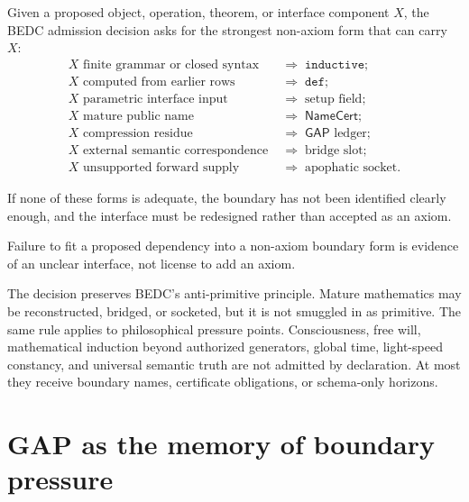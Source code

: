 \begin{definition}
\label{def:external-supply-admission-decision}
Given a proposed object, operation, theorem, or interface component $X$, the BEDC admission decision asks for the strongest non-axiom form that can carry $X$:
$$
\begin{aligned}
X \text{ finite grammar or closed syntax} &\;\Longrightarrow\; \texttt{inductive}; \\
X \text{ computed from earlier rows} &\;\Longrightarrow\; \texttt{def}; \\
X \text{ parametric interface input} &\;\Longrightarrow\; \text{setup field}; \\
X \text{ mature public name} &\;\Longrightarrow\; \mathsf{NameCert}; \\
X \text{ compression residue} &\;\Longrightarrow\; \mathsf{GAP}\text{ ledger}; \\
X \text{ external semantic correspondence} &\;\Longrightarrow\; \text{bridge slot}; \\
X \text{ unsupported forward supply} &\;\Longrightarrow\; \text{apophatic socket}.
\end{aligned}
$$
\end{definition}

If none of these forms is adequate, the boundary has not been identified clearly enough, and the interface must be redesigned rather than accepted as an axiom.

\begin{principle}
\label{prin:external-supply-redesign-before-axiom}
Failure to fit a proposed dependency into a non-axiom boundary form is evidence of an unclear interface, not license to add an axiom.
\end{principle}

The decision preserves BEDC's anti-primitive principle. Mature mathematics may be reconstructed, bridged, or socketed, but it is not smuggled in as primitive. The same rule applies to philosophical pressure points. Consciousness, free will, mathematical induction beyond authorized generators, global time, light-speed constancy, and universal semantic truth are not admitted by declaration. At most they receive boundary names, certificate obligations, or schema-only horizons.

\section{GAP as the memory of boundary pressure}
\label{sec:external-supply-gap-memory}

